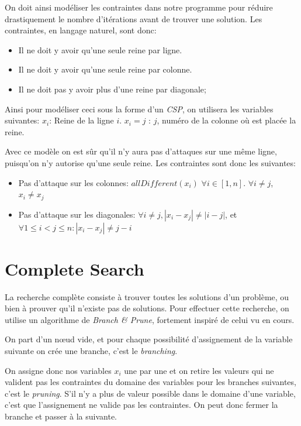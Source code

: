 \documentclass{article}
\begin{document}
On doit ainsi modéliser les contraintes dans notre programme pour réduire drastiquement le nombre d'itérations avant de trouver une solution. Les contraintes, en langage naturel, sont donc:

\begin{itemize}
\item Il ne doit y avoir qu'une seule reine par ligne.
\item Il ne doit y avoir qu'une seule reine par colonne.
\item Il ne doit pas y avoir plus d'une reine par diagonale;
\end{itemize}

Ainsi pour modéliser ceci sous la forme d'un \emph{CSP}, on utilisera les variables suivantes:
$x_i$: Reine de la ligne $i$.
$x_i = j$ : $j$, numéro de la colonne où est placée la reine.

Avec ce modèle on est sûr qu'il n'y aura pas d'attaques sur une même ligne, puisqu'on n'y autorise qu'une seule reine.
Les contraintes sont donc les suivantes:
\begin{itemize}
\item Pas d'attaque sur les colonnes: $allDifferent(x_i)$ $\forall i \in [1, n]$. $\forall i \neq j$, $x_i \neq x_j$

\item Pas d'attaque sur les diagonales:  $\forall i \neq j, |x_i - x_j| \neq |i - j|$, et $\forall  1 \leq i < j \leq n : |x_i - x_j | \neq j - i$
\end{itemize}


\section{Complete Search}

La recherche complète consiste à trouver toutes les solutions d'un problème, ou bien à prouver qu'il n'existe pas de solutions. 
Pour effectuer cette recherche, on utilise un algorithme de \emph{Branch \& Prune}, fortement inspiré de celui vu en cours. 

On part d'un nœud vide, et pour chaque possibilité d'assignement de la variable suivante on crée une branche, c'est le \emph{branching}.

On assigne donc nos variables $x_i$ une par une et on retire les valeurs qui ne valident pas les contraintes du domaine des variables pour les branches suivantes, c'est le \emph{pruning}. S'il n'y a plus de valeur possible dans le domaine d'une variable, c'est que l'assignement ne valide pas les contraintes. On peut donc fermer la branche et passer à la suivante.
\end{document}
